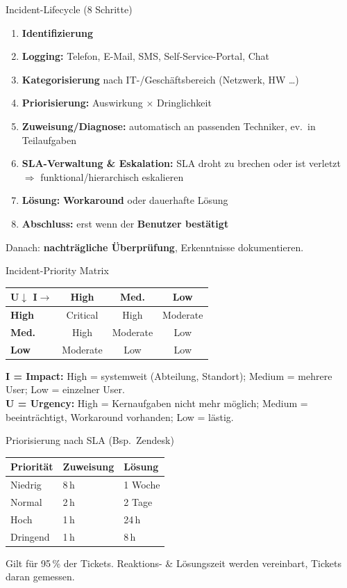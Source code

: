 \documentclass[a4paper, fontsize=7pt]{scrartcl}
\renewcommand*{\arraystretch}{1.5}  %
\begin{document}
\begin{mainbox}{Incident-Lifecycle (8 Schritte)}
\begin{enumerate}
    \item \textbf{Identifizierung}
    \item \textbf{Logging:} Telefon, E-Mail, SMS, Self-Service-Portal, Chat
    \item \textbf{Kategorisierung} nach IT-/Geschäftsbereich (Netzwerk, HW \dots)
    \item \textbf{Priorisierung:} Auswirkung $\times$ Dringlichkeit
    \item \textbf{Zuweisung/Diagnose:} automatisch an passenden Techniker, ev.\
          in Teilaufgaben
    \item \textbf{SLA-Verwaltung \& Eskalation:} SLA droht zu brechen oder ist
          verletzt $\Rightarrow$ funktional/hierarchisch eskalieren
    \item \textbf{Lösung:} \textbf{Workaround} oder dauerhafte Lösung
    \item \textbf{Abschluss:} erst wenn der \textbf{Benutzer bestätigt}
\end{enumerate}
Danach: \textbf{nachträgliche Überprüfung}, Erkenntnisse dokumentieren.
\end{mainbox}

\begin{mainbox}{Incident-Priority Matrix}
\renewcommand*{\arraystretch}{1.15}
\setlength{\tabcolsep}{2pt}
\begin{center}
\begin{tabular}{l|c|c|c}
\textbf{U$\downarrow$ I$\to$} & \textbf{High} & \textbf{Med.} &
  \textbf{Low} \\
\hline
\textbf{High} & Critical & High & Moderate \\
\textbf{Med.} & High & Moderate & Low \\
\textbf{Low} & Moderate & Low & Low \\
\end{tabular}
\end{center}
\textbf{I = Impact:} High = systemweit (Abteilung, Standort); Medium = mehrere User;
Low = einzelner User.\\
\textbf{U = Urgency:} High = Kernaufgaben nicht mehr möglich; Medium = beeinträchtigt,
Workaround vorhanden; Low = lästig.
\end{mainbox}

\begin{subbox}{Priorisierung nach SLA (Bsp.\ Zendesk)}
\renewcommand*{\arraystretch}{1.15}
\setlength{\tabcolsep}{3pt}
\begin{tabularx}{\linewidth}{@{}X|l|l@{}}
\textbf{Priorität} & \textbf{Zuweisung} & \textbf{Lösung} \\
\hline
Niedrig & 8\,h & 1 Woche \\
Normal & 2\,h & 2 Tage \\
Hoch & 1\,h & 24\,h \\
Dringend & 1\,h & 8\,h \\
\end{tabularx}
Gilt für 95\,\% der Tickets. Reaktions- \& Lösungszeit werden vereinbart, Tickets
daran gemessen.
\end{subbox}
\end{document}
